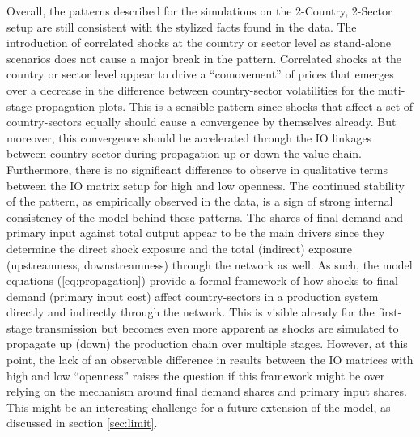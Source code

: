 Overall, the patterns described for the simulations on the 2-Country, 2-Sector setup are still consistent with the stylized facts 
found in the data. The introduction of correlated shocks at the country or sector level as stand-alone scenarios does not 
cause a major break in the pattern. Correlated shocks at the country or sector level appear to drive a ``comovement'' of prices that 
emerges over a decrease in the difference between country-sector volatilities for the muti-stage propagation plots. This is a sensible pattern since 
shocks that affect a set of country-sectors equally should cause a convergence by themselves already. But moreover, this convergence should be 
accelerated through the IO linkages between country-sector during propagation up or down the value chain. Furthermore, there is no significant difference 
to observe in qualitative terms between the IO matrix setup for high and low openness. The continued stability of the pattern, as empirically observed 
in the data, is a sign of strong internal consistency of 
the model behind these patterns. The shares of final demand and primary input against total output appear to be the main drivers 
since they determine the direct shock exposure and the total (indirect) exposure (upstreamness, downstreamness) through the 
network as well. As such, the model equations (\ref{eq:propagation}) provide a formal framework of how shocks to final demand (primary input cost)
affect country-sectors in a production system directly and indirectly through the network. This is visible already for the first-stage transmission 
but becomes even more apparent as shocks are simulated to propagate up (down) the production chain over multiple stages. However, at this point, 
the lack of an observable difference in results between the IO matrices with high and low ``openness''
raises the question if this framework might be over relying on the mechanism around final demand shares and primary input shares. 
This might be an interesting challenge for a future extension of the model, as discussed in section \ref{sec:limit}.

